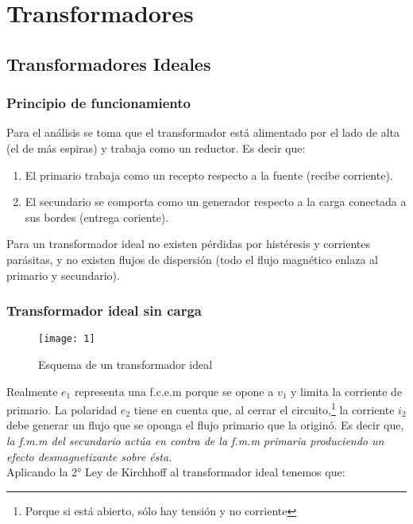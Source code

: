 \section{Transformadores}
\subsection{Transformadores Ideales}
\subsubsection{Principio de funcionamiento}
Para el análisis se toma que el transformador está alimentado por el lado de alta (el de más espiras) y trabaja como un reductor. Es decir que:

\begin{enumerate}
	\item El primario trabaja como un recepto respecto a la fuente (recibe corriente).
	\item El secundario se comporta como un generador respecto a la carga conectada a sus bordes (entrega coriente).
\end{enumerate}

Para un transformador ideal no existen pérdidas por histéresis y corrientes parásitas, y no existen flujos de dispersión (todo el flujo magnético enlaza al primario y secundario).

\subsubsection{Transformador ideal sin carga}

\begin{figure}[h]
	\vspace{-1cm}
	\centering
	\texttt{[image: 1]}
	\caption{Esquema de un transformador ideal}
	\label{fig:transformador-ideal}
\end{figure} 
 
 Realmente $e_{1}$ representa una f.c.e.m porque se opone a $v_{1}$ y limita la corriente de primario. La polaridad $e_{2}$ tiene en cuenta que, al cerrar el circuito,\footnote{Porque si está abierto, sólo hay tensión y no corriente} la corriente $i_{2}$ debe generar un flujo que se oponga el flujo primario que la originó. Es decir que, \textsl{la f.m.m del secundario actúa en contra de la f.m.m primaria produciendo un efecto desmagnetizante sobre ésta.}\\
 
 
 Aplicando la 2° Ley de Kirchhoff al transformador ideal tenemos que:
 
